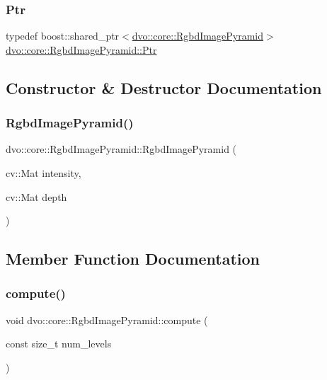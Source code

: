 \subsubsection{\texorpdfstring{Ptr}{Ptr}}
{\footnotesize\ttfamily typedef boost\+::shared\+\_\+ptr$<$\mbox{\hyperlink{structdvo_1_1core_1_1_rgbd_image_pyramid}{dvo\+::core\+::\+Rgbd\+Image\+Pyramid}}$>$ \mbox{\hyperlink{structdvo_1_1core_1_1_rgbd_image_pyramid_a9033ebd4631ed39f36710700092edb26}{dvo\+::core\+::\+Rgbd\+Image\+Pyramid\+::\+Ptr}}}



\subsection{Constructor \& Destructor Documentation}
\mbox{\label{structdvo_1_1core_1_1_rgbd_image_pyramid_af26d5ad8785d1e7747eaec7e247484f9}} 
\subsubsection{\texorpdfstring{Rgbd\+Image\+Pyramid()}{RgbdImagePyramid()}}
{\footnotesize\ttfamily dvo\+::core\+::\+Rgbd\+Image\+Pyramid\+::\+Rgbd\+Image\+Pyramid (\begin{DoxyParamCaption}\item[{cv\+::\+Mat}]{intensity,  }\item[{cv\+::\+Mat}]{depth }\end{DoxyParamCaption})}



\subsection{Member Function Documentation}
\mbox{\label{structdvo_1_1core_1_1_rgbd_image_pyramid_a082e8b87a9a6f87ebbe774c957374127}} 
\subsubsection{\texorpdfstring{compute()}{compute()}}
{\footnotesize\ttfamily void dvo\+::core\+::\+Rgbd\+Image\+Pyramid\+::compute (\begin{DoxyParamCaption}\item[{const size\+\_\+t}]{num\+\_\+levels }\end{DoxyParamCaption})}

